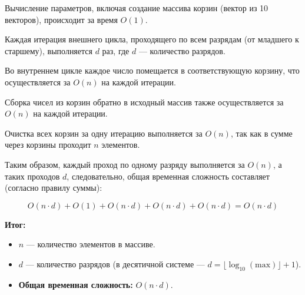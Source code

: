 \documentclass[otchet]{SCWorks}
\begin{document}
Вычисление параметров, включая создание массива корзин (вектор из 10 векторов), происходит за время $O(1)$.

Каждая итерация внешнего цикла, проходящего по всем разрядам (от младшего к старшему), выполняется $d$ раз, где $d$ — количество разрядов.

Во внутреннем цикле каждое число помещается в соответствующую корзину, что осуществляется за $O(n)$ на каждой итерации.

Сборка чисел из корзин обратно в исходный массив также осуществляется за $O(n)$ на каждой итерации.

Очистка всех корзин за одну итерацию выполняется за $O(n)$, так как в сумме через корзины проходит $n$ элементов.

Таким образом, каждый проход по одному разряду выполняется за $O(n)$, а таких проходов $d$, следовательно, общая временная сложность составляет (согласно правилу суммы):

\[
O(n \cdot d) + O(1) + O(n \cdot d) + O(n \cdot d) + O(n \cdot d) = O(n \cdot d)
\]

\textbf{Итог:}
\begin{itemize}
    \item $n$ — количество элементов в массиве.
    \item $d$ — количество разрядов (в десятичной системе — $d = \lfloor \log_{10}(\text{max}) \rfloor + 1$).
    \item \textbf{Общая временная сложность:} $O(n \cdot d)$.
\end{itemize}

	


\appendix
\end{document}
